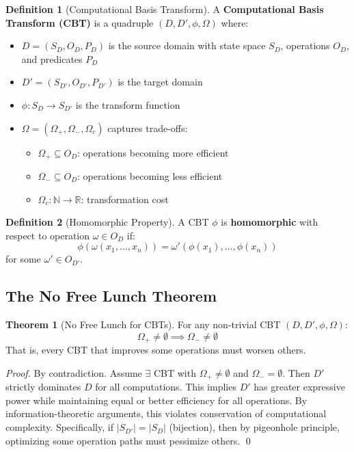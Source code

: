 \documentclass[12pt,a4paper]{article}
\theoremstyle{definition}
\newtheorem{definition}{Definition}
\newtheorem{theorem}{Theorem}
\begin{document}
\begin{definition}[Computational Basis Transform]
A \textbf{Computational Basis Transform (CBT)} is a quadruple $(D, D', \phi, \Omega)$ where:
\begin{itemize}
\item $D = (S_D, O_D, P_D)$ is the source domain with state space $S_D$, operations $O_D$, and predicates $P_D$
\item $D' = (S_{D'}, O_{D'}, P_{D'})$ is the target domain
\item $\phi: S_D \to S_{D'}$ is the transform function
\item $\Omega = (\Omega_+, \Omega_-, \Omega_c)$ captures trade-offs:
  \begin{itemize}
  \item $\Omega_+ \subseteq O_D$: operations becoming more efficient
  \item $\Omega_- \subseteq O_D$: operations becoming less efficient
  \item $\Omega_c: \mathbb{N} \to \mathbb{R}$: transformation cost
  \end{itemize}
\end{itemize}
\end{definition}

\begin{definition}[Homomorphic Property]
A CBT $\phi$ is \textbf{homomorphic} with respect to operation $\omega \in O_D$ if:
\begin{equation}
\phi(\omega(x_1, \ldots, x_n)) = \omega'(\phi(x_1), \ldots, \phi(x_n))
\end{equation}
for some $\omega' \in O_{D'}$.
\end{definition}

\subsection{The No Free Lunch Theorem}

\begin{theorem}[No Free Lunch for CBTs]
\label{thm:nfl}
For any non-trivial CBT $(D, D', \phi, \Omega)$:
\begin{equation}
\Omega_+ \neq \emptyset \implies \Omega_- \neq \emptyset
\end{equation}
That is, every CBT that improves some operations must worsen others.
\end{theorem}

\begin{proof}
By contradiction. Assume $\exists$ CBT with $\Omega_+ \neq \emptyset$ and $\Omega_- = \emptyset$. Then $D'$ strictly dominates $D$ for all computations. This implies $D'$ has greater expressive power while maintaining equal or better efficiency for all operations. By information-theoretic arguments, this violates conservation of computational complexity. Specifically, if $|S_{D'}| = |S_D|$ (bijection), then by pigeonhole principle, optimizing some operation paths must pessimize others. \qed
\end{proof}
\end{document}
